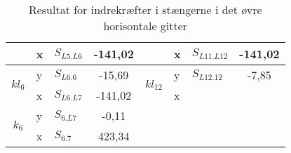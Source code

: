 \begin{table}[H]
{\begin{tabular}{|c|l|l|c|c|l|l|c|}
                        & x                               & $S_{L5.L6}$           & -141,02                   &                            & x          & $S_{L11.L12}$          & -141,02                   \\ \hline
\multirow{2}{*}{$kl_6$} & y                               & $S_{L6.6}$            & -15,69                    & \multirow{2}{*}{$kl_{12}$} & y          & $S_{L12.12}$          & -7,85                     \\ \cline{2-4} \cline{6-8} 
                        & x                               & $S_{L6.L7}$           & -141,02                   &                            & x          &                       &                           \\ \hline
\multirow{2}{*}{$k_6$}  & y                               & $S_{6.L7}$            & -0,11                     & \multirow{2}{*}{}          &            &                       &                           \\ \cline{2-4} \cline{6-8} 
                        & x                               & $S_{6.7}$             & 423,34                    &                            &            &                       &                           \\ \hline
\end{tabular}}
\caption{Resultat for indrekræfter i stængerne i det øvre horisontale gitter}
\label{tab:Indrekrafterovre}
\end{table}
